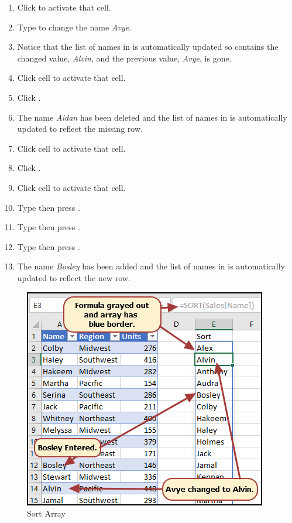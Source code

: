 \begin{enumbox}
	\begin{enumerate}
		\item Click  to activate that cell.
		\item Type  to change the name \textit{Avye}.
		\item Notice that the list of names in  is automatically updated so  contains the changed value, \textit{Alvin}, and the previous value, \textit{Avye}, is gone.
		\item Click cell  to activate that cell.
		\item Click .
		\item The name \textit{Aidan} has been deleted and the list of names in  is automatically updated to reflect the missing row.
		\item Click cell  to activate that cell.
		\item Click .
		\item Click cell  to activate that cell.
		\item Type  then press .
		\item Type  then press .
		\item Type  then press .		
		\item The name \textit{Bosley} has been added and the list of names in  is automatically updated to reflect the new row.
	\end{enumerate}
\end{enumbox}

\begin{figure}[H]
	\centering
	\includegraphics[width=\maxwidth{.95\linewidth}]{gfx/apb_fig01}
	\caption{Sort Array}
	\label{apb:fig01}
\end{figure}

